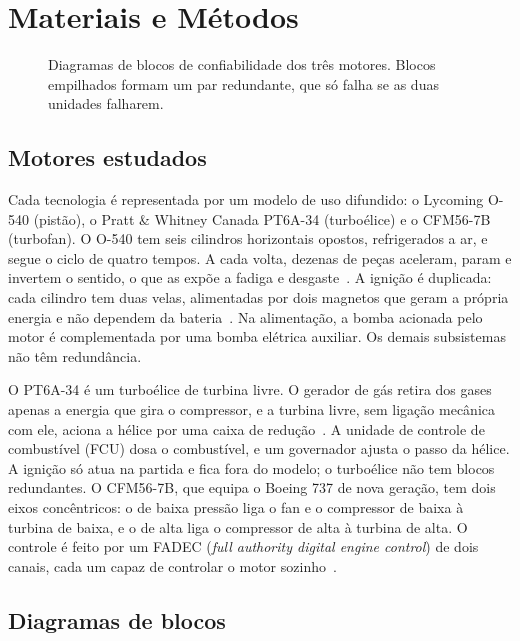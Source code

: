 \section{Materiais e Métodos}\label{sec:metodos}

\begin{figure}[t]
  \centering
  \resizebox{\textwidth}{!}{}
  \caption{Diagramas de blocos de confiabilidade dos três motores. Blocos empilhados formam um par redundante, que só falha se as duas unidades falharem.}
  \label{fig:rbd}
\end{figure}

\subsection{Motores estudados}\label{sec:motores}

Cada tecnologia é representada por um modelo de uso difundido: o Lycoming O-540 (pistão), o Pratt \& Whitney Canada PT6A-34 (turboélice) e o CFM56-7B (turbofan).
O O-540 tem seis cilindros horizontais opostos, refrigerados a ar, e segue o ciclo de quatro tempos.
A cada volta, dezenas de peças aceleram, param e invertem o sentido, o que as expõe a fadiga e desgaste~\cite{faa_amt}.
A ignição é duplicada: cada cilindro tem duas velas, alimentadas por dois magnetos que geram a própria energia e não dependem da bateria~\cite{faa_phak}.
Na alimentação, a bomba acionada pelo motor é complementada por uma bomba elétrica auxiliar.
Os demais subsistemas não têm redundância.

O PT6A-34 é um turboélice de turbina livre.
O gerador de gás retira dos gases apenas a energia que gira o compressor, e a turbina livre, sem ligação mecânica com ele, aciona a hélice por uma caixa de redução~\cite{faa_amt}.
A unidade de controle de combustível (FCU) dosa o combustível, e um governador ajusta o passo da hélice.
A ignição só atua na partida e fica fora do modelo; o turboélice não tem blocos redundantes.
O CFM56-7B, que equipa o Boeing 737 de nova geração, tem dois eixos concêntricos: o de baixa pressão liga o fan e o compressor de baixa à turbina de baixa, e o de alta liga o compressor de alta à turbina de alta.
O controle é feito por um FADEC (\emph{full authority digital engine control}) de dois canais, cada um capaz de controlar o motor sozinho~\cite{faa_amt}.

\subsection{Diagramas de blocos}\label{sec:rbd}

